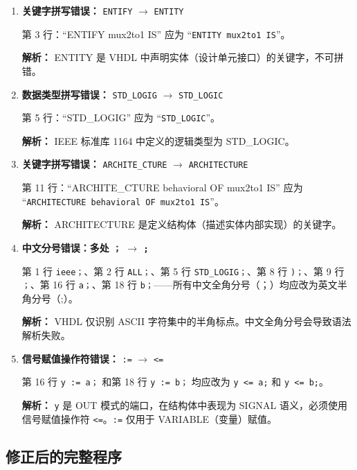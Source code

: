 \begin{enumerate}[label=\textbf{错误\arabic*：},leftmargin=*]

\item \textbf{关键字拼写错误：} \texttt{ENTIFY} $\rightarrow$ \texttt{ENTITY}

    第 3 行：``ENTIFY mux2to1 IS'' 应为 ``\texttt{ENTITY mux2to1 IS}''。

    \textbf{解析：} ENTITY 是 VHDL 中声明实体（设计单元接口）的关键字，不可拼错。

\item \textbf{数据类型拼写错误：} \texttt{STD\_LOGIG} $\rightarrow$ \texttt{STD\_LOGIC}

    第 5 行：``STD\_LOGIG'' 应为 ``\texttt{STD\_LOGIC}''。

    \textbf{解析：} IEEE 标准库 1164 中定义的逻辑类型为 STD\_LOGIC。

\item \textbf{关键字拼写错误：} \texttt{ARCHITE\_CTURE} $\rightarrow$ \texttt{ARCHITECTURE}

    第 11 行：``ARCHITE\_CTURE behavioral OF mux2to1 IS'' 应为 ``\texttt{ARCHITECTURE behavioral OF mux2to1 IS}''。

    \textbf{解析：} ARCHITECTURE 是定义结构体（描述实体内部实现）的关键字。

\item \textbf{中文分号错误：多处 \texttt{；} $\rightarrow$ \texttt{;}}

    第 1 行 \texttt{ieee；}、第 2 行 \texttt{ALL；}、第 5 行 \texttt{STD\_LOGIG；}、第 8 行 \texttt{)；}、第 9 行 \texttt{；}、第 16 行 \texttt{a；}、第 18 行 \texttt{b；}——所有中文全角分号（；）均应改为英文半角分号（;）。

    \textbf{解析：} VHDL 仅识别 ASCII 字符集中的半角标点。中文全角分号会导致语法解析失败。

\item \textbf{信号赋值操作符错误：} \texttt{:=} $\rightarrow$ \texttt{<=}

    第 16 行 \texttt{y := a；} 和第 18 行 \texttt{y := b；} 均应改为 \texttt{y <= a;} 和 \texttt{y <= b;}。

    \textbf{解析：} \texttt{y} 是 OUT 模式的端口，在结构体中表现为 SIGNAL 语义，必须使用信号赋值操作符 \texttt{<=}。\texttt{:=} 仅用于 VARIABLE（变量）赋值。

\end{enumerate}

\subsection*{修正后的完整程序}

